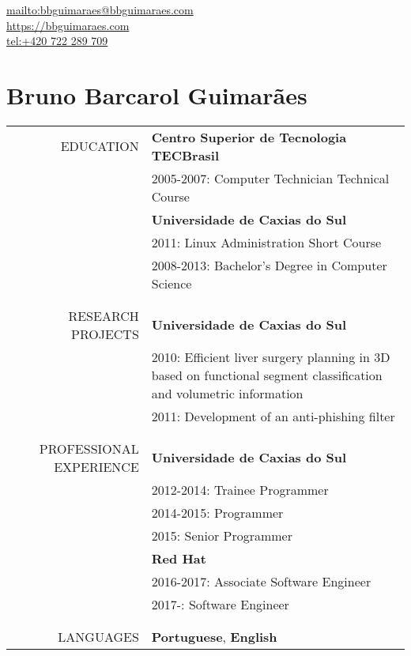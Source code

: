 \begin{flushright}
    \url{mailto:bbguimaraes@bbguimaraes.com} \\
    \url{https://bbguimaraes.com} \\
    \url{tel:+420 722 289 709}
\end{flushright}

\vspace{-2\baselineskip}
\section*{Bruno Barcarol Guimarães}
\bigskip

\begin{tabular}{rp{12cm}}
    \uppercase{Education}
    & \textbf{Centro Superior de Tecnologia TECBrasil} \\
    & 2005-2007: Computer Technician Technical Course \\
    & \textbf{Universidade de Caxias do Sul} \\
    & 2011: Linux Administration Short Course \\
    & 2008-2013: Bachelor's Degree in Computer Science
    \\\\ \hline \\
    \uppercase{Research projects}
    & \textbf{Universidade de Caxias do Sul} \\
    & 2010:
        Efficient liver surgery planning in 3D based on functional segment
        classification and volumetric information \\
    & 2011: Development of an anti-phishing filter
    \\\\ \hline \\
    \uppercase{Professional experience}
    & \textbf{Universidade de Caxias do Sul} \\
    & 2012-2014: Trainee Programmer \\
    & 2014-2015: Programmer \\
    & 2015: Senior Programmer \\
    & \textbf{Red Hat} \\
    & 2016-2017: Associate Software Engineer \\
    & 2017-: Software Engineer
    \\\\ \hline \\
    \uppercase{Languages}
    & \textbf{Portuguese}, \textbf{English} \\

\end{tabular}
